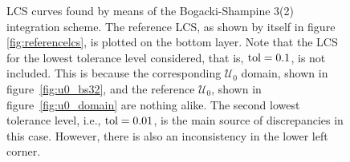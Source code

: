 \begin{figure}[htpb]
    \centering
    
    \caption[LCS curves found by means of the Bogacki-Shampine 3(2) integration
    scheme]{
        LCS curves found by means of the Bogacki-Shampine 3(2) integration
        scheme. The reference LCS, as shown by itself in figure
        \ref{fig:referencelcs}, is plotted on the bottom layer. Note that
        the LCS for the lowest tolerance level considered, that is,
        $\textnormal{tol}=0.1$,
        is not included. This is because the corresponding $\mathcal{U}_{0}$
        domain, shown in figure~\ref{fig:u0_bs32}, and the reference
        $\mathcal{U}_{0}$, shown in figure~\ref{fig:u0_domain} are nothing
        alike. The second lowest tolerance level, i.e., $\textnormal{tol}=0.01$,
        is the main source of discrepancies in this case. However, there is
    also an inconsistency in the lower left corner.}
    \label{fig:lcs_rkbs32}
\end{figure}
